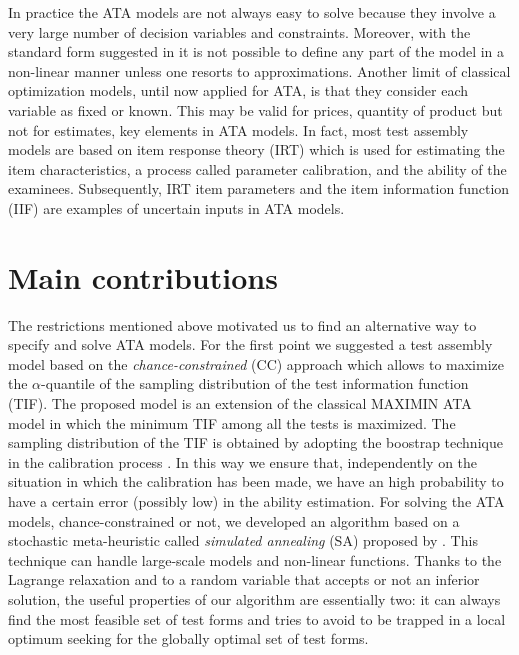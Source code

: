 In practice the ATA models are not always easy to solve because they involve a very large number of decision variables and constraints. Moreover, with the standard form suggested in \textcite{VDL2005} it is not possible to define any part of the model in a non-linear manner unless one resorts to approximations. Another limit of classical optimization models, until now applied for ATA, is that they consider each variable as fixed or known. This may be valid for prices, quantity of product but not for estimates, key elements in ATA models. In fact, most test assembly models are based on item response theory (IRT) which is used for estimating the item characteristics, a process called parameter calibration, and the ability of the examinees. Subsequently, IRT item parameters and the item information function (IIF) are examples of uncertain inputs in ATA models. 

\section{Main contributions}

The restrictions mentioned above motivated us to find an alternative way to specify and solve ATA models. For the first point we suggested a test assembly model based on the \emph{chance-constrained} (CC) approach \parencite[see][]{charnes1958cost} which allows to maximize the $\alpha$-quantile of the sampling distribution of the test information function (TIF). The proposed model is an extension of the classical MAXIMIN ATA model \parencite[][, p.69-70]{VDL2005} in which the minimum TIF among all the tests is maximized. The sampling distribution of the TIF is obtained by adopting the boostrap technique in the calibration process \parencite{efron1993, shao2012}. In this way we ensure that, independently on the situation in which the calibration has been made, we have an high probability to have a certain error (possibly low) in the ability estimation. For solving the ATA models, chance-constrained or not, we developed an algorithm based on a stochastic meta-heuristic called \emph{simulated annealing} (SA) proposed by \textcite{goffe1996simann}. This technique can handle large-scale models and non-linear functions. Thanks to the Lagrange relaxation and to a random variable that accepts or not an inferior solution, the useful properties of our algorithm are essentially two: it can always find the most feasible set of test forms and tries to avoid to be trapped in a local optimum seeking for the globally optimal set of test forms.

